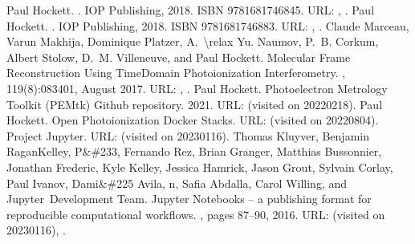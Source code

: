 \documentclass[letterpaper,table,10pt,english]{jupyterBook}
\begin{document}
\begin{sphinxthebibliography}{10}
\sphinxAtStartPar
Paul Hockett. . IOP Publishing, 2018. ISBN 978\sphinxhyphen{}1\sphinxhyphen{}68174\sphinxhyphen{}684\sphinxhyphen{}5. URL: , .
\sphinxAtStartPar
Paul Hockett. . IOP Publishing, 2018. ISBN 978\sphinxhyphen{}1\sphinxhyphen{}68174\sphinxhyphen{}688\sphinxhyphen{}3. URL: , .
\sphinxAtStartPar
Claude Marceau, Varun Makhija, Dominique Platzer, A. \textbackslash{}relax Yu. Naumov, P. B. Corkum, Albert Stolow, D. M. Villeneuve, and Paul Hockett. Molecular Frame Reconstruction Using Time\sphinxhyphen{}Domain Photoionization Interferometry. , 119(8):083401, August 2017. URL: , .
\sphinxAtStartPar
Paul Hockett. Photoelectron Metrology Toolkit (PEMtk) Github repository. 2021. URL:  (visited on 2022\sphinxhyphen{}02\sphinxhyphen{}18).
\sphinxAtStartPar
Paul Hockett. Open Photoionization Docker Stacks. URL:  (visited on 2022\sphinxhyphen{}08\sphinxhyphen{}04).
\sphinxAtStartPar
Project Jupyter. URL:  (visited on 2023\sphinxhyphen{}01\sphinxhyphen{}16).
\sphinxAtStartPar
Thomas Kluyver, Benjamin Ragan\sphinxhyphen{}Kelley, P\&\#233, Fernando Rez, Brian Granger, Matthias Bussonnier, Jonathan Frederic, Kyle Kelley, Jessica Hamrick, Jason Grout, Sylvain Corlay, Paul Ivanov, Dami\&\#225 Avila, n, Safia Abdalla, Carol Willing, and Jupyter Development Team. Jupyter Notebooks – a publishing format for reproducible computational workflows. , pages 87–90, 2016. URL:  (visited on 2023\sphinxhyphen{}01\sphinxhyphen{}16), .

\end{sphinxthebibliography}
\end{document}
